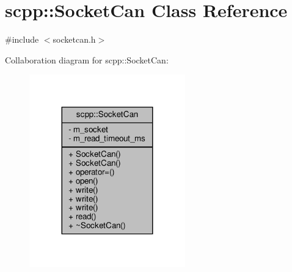 \hypertarget{classscpp_1_1SocketCan}{}\section{scpp\+:\+:Socket\+Can Class Reference}
\label{classscpp_1_1SocketCan}


{\ttfamily \#include $<$socketcan.\+h$>$}



Collaboration diagram for scpp\+:\+:Socket\+Can\+:
\nopagebreak
\begin{figure}[H]
\begin{center}
\leavevmode
\includegraphics[width=191pt]{classscpp_1_1SocketCan__coll__graph}
\end{center}
\end{figure}
